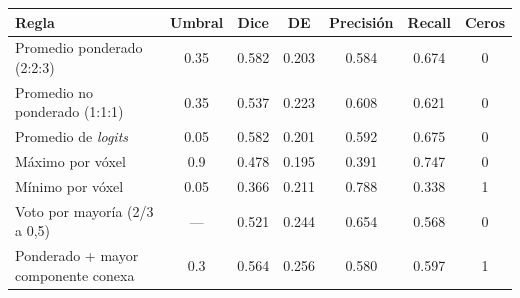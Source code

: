 \small
\begin{tabular}{lcccccc}
\toprule
Regla & Umbral & Dice & DE & Precisión & Recall & Ceros \\
\midrule
Promedio ponderado (2:2:3) & 0.35 & 0.582 & 0.203 & 0.584 & 0.674 & 0 \\
Promedio no ponderado (1:1:1) & 0.35 & 0.537 & 0.223 & 0.608 & 0.621 & 0 \\
Promedio de \emph{logits} & 0.05 & 0.582 & 0.201 & 0.592 & 0.675 & 0 \\
Máximo por vóxel & 0.9 & 0.478 & 0.195 & 0.391 & 0.747 & 0 \\
Mínimo por vóxel & 0.05 & 0.366 & 0.211 & 0.788 & 0.338 & 1 \\
Voto por mayoría (2/3 a 0{,}5) & --- & 0.521 & 0.244 & 0.654 & 0.568 & 0 \\
Ponderado + mayor componente conexa & 0.3 & 0.564 & 0.256 & 0.580 & 0.597 & 1 \\
\bottomrule
\end{tabular}%
